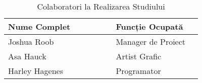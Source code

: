 \begin{table}[h]
    \begin{tabular}{ | p{0.5\linewidth} | p{0.4\linewidth} | }
        \hline
        Nume Complet & Funcție Ocupată \\
        \hline
        Joshua Roob & Manager de Proiect \\
        Asa Hauck & Artist Grafic \\
        Harley Hagenes & Programator \\
        \hline
    \end{tabular}
    \caption{Colaboratori la Realizarea Studiului}
    \label{tab:small_table}
\end{table}